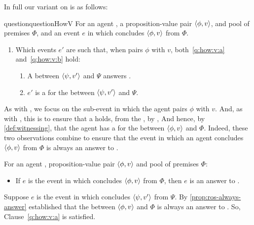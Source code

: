 \begin{note}
  In full our variant on \qHow{} is as follows:

  \begin{restatable}[\qHowV{}]{question}{questionHowV}
    \label{q:how:v}
    For an agent \vAgent{}, a proposition-value pair \(\langle \phi, v \rangle\), and pool of premises \(\Phi\), and an event \(e\) in which \vAgent{} concludes \(\langle \phi, v \rangle\) from \(\Phi\).

    \begin{enumerate}[label=]
    \item
      Which events \(e'\) are such that, when \vAgent{} pairs \(\phi\) with \(v\), both~\ref{q:how:v:a} and~\ref{q:how:v:b} hold:
      \begin{enumerate}[label=\alph*., ref=(\alph*), , series=qHowVdef]
      \item
        \label{q:how:v:a}
        A \ros{} between \(\langle \psi, v' \rangle\) and \(\Psi\) answers \qWhyVnP{}.
      \item
        \label{q:how:v:b}
        \(e'\) is a  for the \ros{} between \(\langle \psi, v' \rangle\) and \(\Psi\).
      \end{enumerate}
    \end{enumerate}
    \vspace{-\baselineskip}
  \end{restatable}

  As with \qWhyVnP{}, we focus on the sub-event in which the agent pairs \(\phi\) with \(v\).
  And, as with \qWhyVnP{}, this is to ensure that a \ros{} holds, from the \agpe{}, by \supportI{},
  And hence, by \autoref{def:witnessing}, that the agent has a \wit{} for the \ros{} between \(\langle \phi, v \rangle\) and \(\Phi\).
  Indeed, these two observations combine to ensure that the event in which an agent concludes \(\langle \phi, v \rangle\) from \(\Phi\) is always an answer to \qHowV{}.

  \begin{proposition}
    \label{prop:phi-always-how}
    For an agent \vAgent{}, proposition-value pair \(\langle \phi, v \rangle\) and pool of premises \(\Phi\):

    \begin{itemize}
    \item
      If \(e\) is the event in which \vAgent{} concludes \(\langle \phi, v \rangle\) from \(\Phi\), then \(e\) is an answer to \qHowV{}.
    \end{itemize}
    \begin{argument}
      Suppose \(e\) is the event in which \vAgent{} concludes \(\langle \psi, v' \rangle\) from \(\Psi\).
      By \autoref{prop:ros-always-answer} established that the \ros{} between \(\langle \phi, v \rangle\) and \(\Phi\) is always an answer to \qWhyVnP{}.
      So, Clause~\ref{q:how:v:a} is satisfied.


\end{argument}
\end{proposition}
\end{note}
